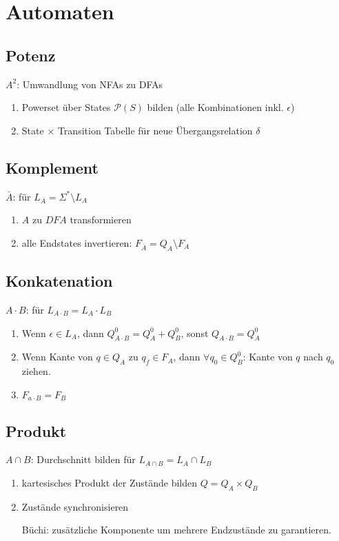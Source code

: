 \documentclass{summary}
\author{Leopold Lemmermann}
\begin{document}
\createtitle

\section{Automaten}
\subsection{Potenz}
$A^2$: Umwandlung von NFAs zu DFAs

\begin{enumerate}
  \item Powerset über States $\mathcal{P}(S)$ bilden (alle Kombinationen inkl. $\epsilon$)
  \item State $\times$ Transition Tabelle für neue Übergangsrelation $\delta$
\end{enumerate}

\subsection{Komplement}
$\bar{A}$: für $L_{\bar{A}} =\Sigma^* \setminus L_A$

\begin{enumerate}
  \item $A$ zu $DFA$ transformieren
  \item alle Endstates invertieren: $F_{\bar{A}}=Q_A\setminus F_A$
\end{enumerate}

\subsection{Konkatenation}
$A\cdot B$: für $L_{A\cdot B}=L_A\cdot L_B$

\begin{enumerate}
  \item Wenn $\epsilon\in L_A$, dann $Q_{A\cdot B}^0=Q_A^0+Q_B^0$, sonst $Q_{A\cdot B}=Q_A^0$
  \item Wenn Kante von $q\in Q_A$ zu $q_f\in F_A$, dann $\forall q_0\in Q_B^0$: Kante von $q$ nach $q_0$ ziehen.
  \item $F_{a\cdot B}=F_B$
\end{enumerate}

\subsection{Produkt}
$A\cap B$: Durchschnitt bilden für $L_{A\cap B}=L_A\cap L_B$

\begin{enumerate}
  \item kartesisches Produkt der Zustände bilden $Q=Q_A\times Q_B$
  \item Zustände synchronisieren
  \item[Büchi:] zusätzliche Komponente um mehrere Endzustände zu garantieren.
\end{enumerate}
\end{document}
